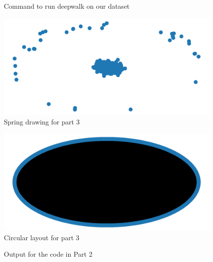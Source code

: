 \documentclass{article}
\begin{document}
\begin{figure}
    \centering
    
    \caption{Command to run deepwalk on our dataset}
    \label{fig:part3deepwalk}
\end{figure}


\begin{figure}
    \centering
    \includegraphics[width=\textwidth,height=\textheight,keepaspectratio]{spring_draw.png}
    \caption{Spring drawing for part 3}
    \label{fig:part3spring}
\end{figure}

%     

\begin{figure}
    \centering
    \includegraphics[width=\textwidth,height=\textheight,keepaspectratio]{circular_layout.png}
    \caption{Circular layout for part 3}
    \label{fig:part3circular}
\end{figure}

\begin{figure}
    \centering
    
    \caption{Output for the code in Part 2}
    \label{fig:part2output}
\end{figure}
\end{document}
